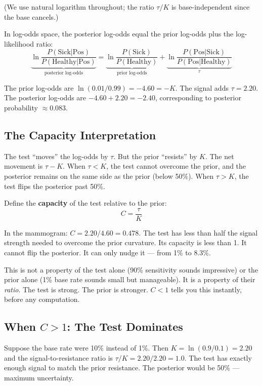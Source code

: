 \documentclass[12pt]{article}
\begin{document}
(We use natural logarithm throughout; the ratio $\tau/K$ is base-independent since the base cancels.)

In log-odds space, the posterior log-odds equal the prior log-odds plus the log-likelihood ratio:
\begin{equation}
\underbrace{\ln \frac{P(\text{Sick}|\text{Pos})}{P(\text{Healthy}|\text{Pos})}}_{\text{posterior log-odds}} = \underbrace{\ln \frac{P(\text{Sick})}{P(\text{Healthy})}}_{\text{prior log-odds}} + \underbrace{\ln \frac{P(\text{Pos}|\text{Sick})}{P(\text{Pos}|\text{Healthy})}}_{\tau}
\end{equation}

The prior log-odds are $\ln(0.01/0.99) = -4.60 = -K$. The signal adds $\tau = 2.20$. The posterior log-odds are $-4.60 + 2.20 = -2.40$, corresponding to posterior probability $\approx 0.083$.

\subsection{The Capacity Interpretation}

The test ``moves'' the log-odds by $\tau$. But the prior ``resists'' by $K$. The net movement is $\tau - K$. When $\tau < K$, the test cannot overcome the prior, and the posterior remains on the same side as the prior (below 50\%). When $\tau > K$, the test flips the posterior past 50\%.

Define the \textbf{capacity} of the test relative to the prior:
\begin{equation}
C = \frac{\tau}{K}
\end{equation}

In the mammogram: $C = 2.20 / 4.60 = 0.478$. The test has less than half the signal strength needed to overcome the prior curvature. Its capacity is less than 1. It cannot flip the posterior. It can only nudge it --- from 1\% to 8.3\%.

This is not a property of the test alone (90\% sensitivity sounds impressive) or the prior alone (1\% base rate sounds small but manageable). It is a property of their \textit{ratio}. The test is strong. The prior is stronger. $C < 1$ tells you this instantly, before any computation.

\subsection{When $C > 1$: The Test Dominates}

Suppose the base rate were 10\% instead of 1\%. Then $K = \ln(0.9/0.1) = 2.20$ and the signal-to-resistance ratio is $\tau/K = 2.20/2.20 = 1.0$. The test has exactly enough signal to match the prior resistance. The posterior would be 50\% --- maximum uncertainty.
\end{document}
